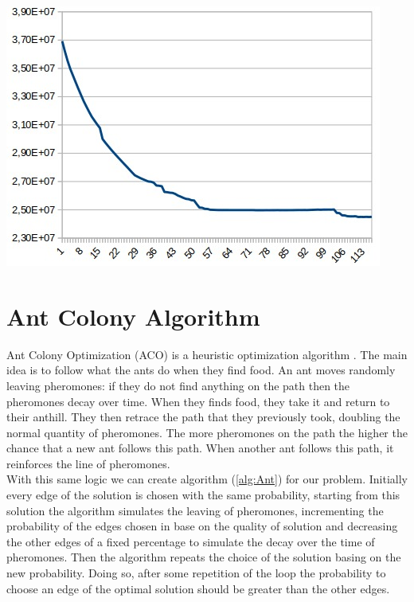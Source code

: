 \begin{center}
	\includegraphics[scale=0.5]{Graphics/graph2.jpeg}
	\label{img:wfcp}
\end{center}

\newpage
\section{Ant Colony Algorithm}
Ant Colony Optimization (ACO) is a heuristic optimization algorithm . The main idea is to follow what the ants do when they find food. An ant moves randomly leaving pheromones: if they do not find anything on the path then the pheromones decay over time. When they finds food, they take it and return to their anthill. They then retrace the path that they previously took, doubling the normal quantity of pheromones. The more pheromones on the path the higher the chance that a new ant follows this path. When another ant follows this path, it reinforces the line of pheromones.\\
With this same logic we can create algorithm (\ref{alg:Ant}) for our problem. Initially every edge of the solution is chosen with the same probability, starting from this solution the algorithm simulates the leaving of pheromones, incrementing the probability of the edges chosen in base on the quality of solution and decreasing the other edges of a fixed percentage to simulate the decay over the time of pheromones. Then the algorithm repeats the choice of the solution basing on the new probability. Doing so, after some repetition of the loop the probability to choose an edge of the optimal solution should be greater than the other edges.\\

